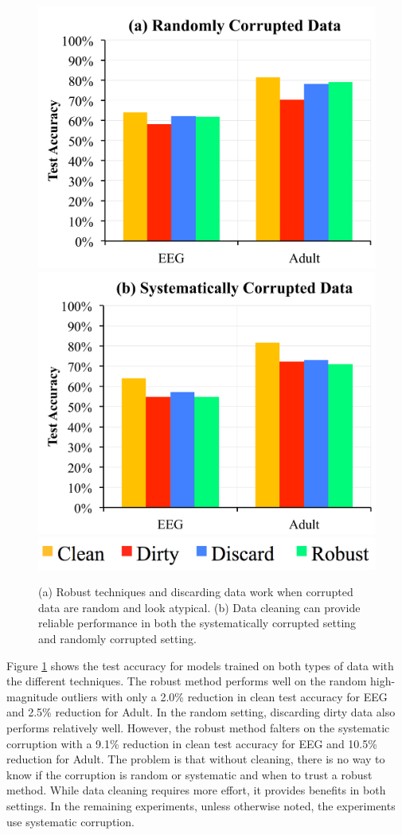 \begin{figure}[t]
\centering
 \includegraphics[width=0.49\columnwidth]{exp/exp2.pdf}
 \includegraphics[width=0.49\columnwidth]{exp/exp1.pdf}
 \includegraphics[width=0.5\columnwidth]{exp/legend-1.png}\vspace{-1em}
 \caption{(a) Robust techniques and discarding data work when corrupted data are random and look atypical. (b) Data cleaning can provide reliable performance in both the systematically corrupted setting and randomly corrupted setting.\label{sys-rand}}\vspace{-1.5em}
\end{figure}

Figure \ref{sys-rand} shows the test accuracy for models trained on both types of data with the different techniques.
The robust method performs well on the random high-magnitude outliers with only a 2.0\% reduction in clean test accuracy for EEG and 2.5\% reduction for Adult.
In the random setting, discarding dirty data also performs relatively well.
However, the robust method falters on the systematic corruption with a 9.1\% reduction in clean test accuracy for EEG and 10.5\% reduction for Adult.
The problem is that without cleaning, there is no way to know if the corruption is random or systematic and when to trust a robust method.
While data cleaning requires more effort, it provides benefits in both settings.
In the remaining experiments, unless otherwise noted, the experiments use systematic corruption.

